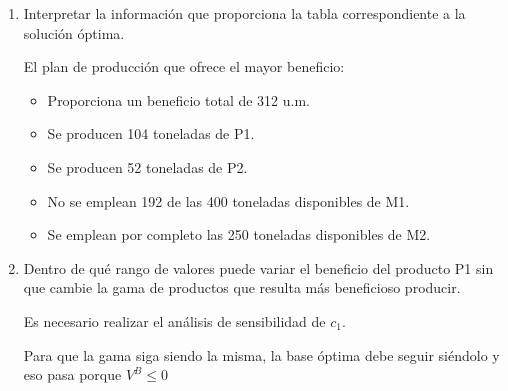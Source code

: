 \begin{enumerate}
    \item Interpretar la información que proporciona la tabla correspondiente a la solución óptima.

    El plan de producción que ofrece el mayor beneficio:
    \begin{itemize}
        \item Proporciona un beneficio total de 312 u.m.
        \item Se producen 104 toneladas de P1.
        \item Se producen 52 toneladas de P2.
        \item No se emplean 192 de las 400 toneladas disponibles de M1.
        \item Se emplean por completo las 250 toneladas disponibles de M2.
    \end{itemize}

    \item Dentro de qué rango de valores puede variar el beneficio del producto P1 sin que cambie la gama de productos que resulta más beneficioso producir.

    Es necesario realizar el análisis de sensibilidad de $c_1$.

    Para que la gama siga siendo la misma, la base óptima debe seguir siéndolo y eso pasa porque $V^B \leq 0$


\end{enumerate}
